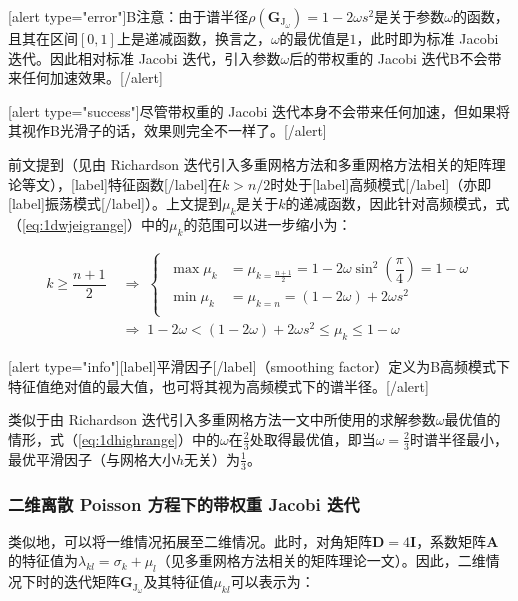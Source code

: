 \documentclass[12pt, UTF8, nofonts]{ctexart}
\begin{document}
[alert type="error"]B注意：由于谱半径$\rho(\boldsymbol{G}_{\mathrm{J}_\omega})=1-2\omega s^2$是关于参数$\omega$的函数，且其在区间$[0,1]$上是递减函数，换言之，$\omega$的最优值是$1$，此时即为标准 Jacobi 迭代。因此相对标准 Jacobi 迭代，引入参数$\omega$后的带权重的 Jacobi 迭代B不会带来任何加速效果。[/alert]

[alert type="success"]尽管带权重的 Jacobi 迭代本身不会带来任何加速，但如果将其视作B光滑子的话，效果则完全不一样了。[/alert]

前文提到（见由 Richardson 迭代引入多重网格方法和多重网格方法相关的矩阵理论等文），[label]特征函数[/label]在$k>n/2$时处于[label]高频模式[/label]（亦即[label]振荡模式[/label]）。上文提到$\mu_k$是关于$k$的递减函数，因此针对高频模式，式（\ref{eq:1dwjeigrange}）中的$\mu_k$的范围可以进一步缩小为：

\begin{equation}
  \label{eq:1dhighrange}
  \begin{aligned}
    k \geq \dfrac{n+1}{2} \;&\Rightarrow\;
    \left\{\; \begin{aligned}
      \max\mu_k &= \mu_{k=\frac{n+1}{2}} = 1 - 2\omega \sin^2\left(\dfrac{\pi}{4}\right) = 1 - \omega \\
      \min\mu_k &= \mu_{k=n} = (1-2\omega)+2\omega s^2 \\
    \end{aligned}\right. \\
    &\Rightarrow\; 1-2\omega < (1-2\omega) + 2\omega s^2 \leq \mu_{k} \leq 1 - \omega
  \end{aligned}
\end{equation}

[alert type="info"][label]平滑因子[/label]（smoothing factor）定义为B高频模式下特征值绝对值的最大值，也可将其视为高频模式下的谱半径。[/alert]

类似于由 Richardson 迭代引入多重网格方法一文中所使用的求解参数$\omega$最优值的情形，式（\ref{eq:1dhighrange}）中的$\omega$在$\frac{2}{3}$处取得最优值，即当$\omega=\frac{2}{3}$时谱半径最小，最优平滑因子（与网格大小$h$无关）为$\frac{1}{3}$。



\subsubsection*{二维离散 Poisson 方程下的带权重 Jacobi 迭代}

类似地，可以将一维情况拓展至二维情况。此时，对角矩阵$\boldsymbol{D}=4\boldsymbol{I}$，系数矩阵$\boldsymbol{A}$的特征值为$\lambda_{kl}=\sigma_k+\mu_l$（见多重网格方法相关的矩阵理论一文）。因此，二维情况下时的迭代矩阵$\boldsymbol{G}_{\mathrm{J}_\omega}$及其特征值$\mu_{kl}$可以表示为：
\end{document}
